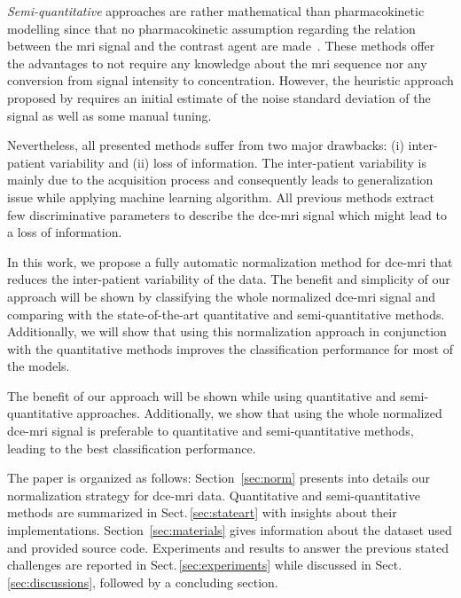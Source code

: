 \emph{Semi-quantitative} approaches are rather mathematical than pharmacokinetic modelling since that no pharmacokinetic assumption regarding the relation between the \ac{mri} signal and the contrast agent are made~\citep{huisman2001accurate,gliozzi2011phenomenological}.
These methods offer the advantages to not require any knowledge about the \ac{mri} sequence nor any conversion from signal intensity to concentration.
However, the heuristic approach proposed by \citeauthor{huisman2001accurate} requires an initial estimate of the noise standard deviation of the signal as well as some manual tuning.

Nevertheless, all presented methods suffer from two major drawbacks:
(i) inter-patient variability and (ii) loss of information.
The inter-patient variability is mainly due to the acquisition process and consequently leads to generalization issue while applying machine learning algorithm.
All previous methods extract few discriminative parameters to describe the \ac{dce}-\ac{mri} signal which might lead to a loss of information.

In this work, we propose a fully automatic normalization method for \ac{dce}-\ac{mri} that reduces the inter-patient variability of the data.
The benefit and simplicity of our approach will be shown by classifying the whole normalized \ac{dce}-\ac{mri} signal and comparing with the state-of-the-art quantitative and semi-quantitative methods.
Additionally, we will show that using this normalization approach in conjunction with the quantitative methods improves the classification performance for most of the models.

The benefit of our approach will be shown while using quantitative and semi-quantitative approaches.
Additionally, we show that using the whole normalized \ac{dce}-\ac{mri} signal is preferable to quantitative and semi-quantitative methods, leading to the best classification performance.

The paper is organized as follows:
Section~\ref{sec:norm} presents into details our normalization strategy for \ac{dce}-\ac{mri} data.
Quantitative and semi-quantitative methods are summarized in Sect.\,\ref{sec:stateart} with insights about their implementations.
Section~\ref{sec:materials} gives information about the dataset used and provided source code.
Experiments and results to answer the previous stated challenges are reported in Sect.\,\ref{sec:experiments} while discussed in Sect.\,\ref{sec:discussions}, followed by a concluding section.

